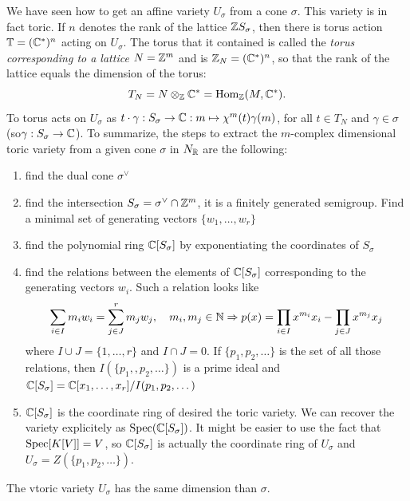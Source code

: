             We have seen how to get an affine variety $U_\sigma$ from a cone $\sigma$. This variety is in fact toric. If $n$ denotes the rank of the lattice $\mathbb{Z} S_\sigma$, then there is torus action $\mathbb{T}=(\mathbb{C}^*)^n$ acting on $U_\sigma$. The torus that it contained is called the \emph{torus corresponding to a lattice} $N=\mathbb{Z}^m$ and is $\mathbb{Z}_N=(\mathbb{C}^*)^n$, so that the rank of the lattice equals the dimension of the torus:
            \begin{equation}
                T_N = N\otimes_{\mathbb{Z}}\mathbb{C}^*=\text{Hom}_{\mathbb{Z}}(M,\mathbb{C}^*).
            \end{equation}
            To torus acts on $U_\sigma$ as $t\cdot\gamma:S_\sigma\to\mathbb{C}:m\mapsto\chi^m(t)\gamma(m)$, for all $t\in T_N$ and $\gamma\in\sigma$ (so$\gamma:S_\sigma\to\mathbb{C}$). To summarize, the steps to extract the $m$-complex dimensional toric variety from a given cone $\sigma$ in $N_{\mathbb{R}}$ are the following:
            \begin{enumerate}
                \item find the dual cone $\sigma^\vee$
                \item find the intersection $S_\sigma = \sigma^\vee\cap\mathbb{Z}^m$, it is a finitely generated semigroup. Find a minimal set of generating vectors $\{w_1,\dots,w_r\}$
                \item find the polynomial ring $\mathbb{C}[S_\sigma]$ by exponentiating the coordinates of $S_\sigma$
                \item find the relations between the elements of $\mathbb{C}[S_\sigma]$ corresponding to the generating vectors $w_i$. Such a relation looks like
                \begin{equation}
                    \sum_{i\in I} m_iw_i=\sum^r_{j\in J}m_jw_j,\quad m_i,m_j\in\mathbb{N}\Rightarrow p(x)=\prod_{i\in I}x^{m_i}x_i-\prod_{j\in J}x^{m_j}x_j
                \end{equation}
                where $I\cup J=\{1,\dots,r\}$ and $I\cap J=0$. If $\{p_1,p_2,\dots\}$ is the set of all those relations, then $I(\{p_1,,p_2,\dots\})$ is a prime ideal and $\mathbb{C}[S_\sigma]=\mathbb{C}[x_1,\dots,x_r]/I(p_1,p_2,\dots)$
                \item $\mathbb{C}[S_\sigma]$ is the coordinate ring of desired the toric variety. We can recover the variety explicitely as $\text{Spec}(\mathbb{C}[S_\sigma])$. It might be easier to use the fact that $\text{Spec}[K[V]]=V$, so $\mathbb{C}[S_\sigma]$ is actually the coordinate ring of $U_\sigma$ and $U_\sigma=Z(\{p_1,p_2,\dots\})$.
            \end{enumerate}
            The vtoric variety $U_\sigma$ has the same dimension than $\sigma$.

